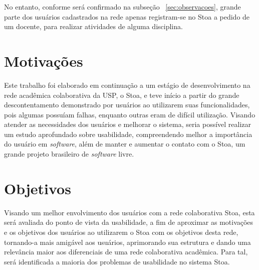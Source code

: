     No entanto, conforme será confirmado na subseção ~\ref{sec:observacoes}, grande parte dos usuários cadastrados na rede apenas registram-se no Stoa a pedido de um docente, para realizar atividades de alguma disciplina. 
    


\section{Motivações}
\label{sec:motivos}

    Este trabalho foi elaborado em continuação a um estágio de desenvolvimento na rede acadêmica colaborativa da USP, o Stoa, e teve início a partir do grande descontentamento demonstrado por usuários ao utilizarem suas funcionalidades, pois algumas possuíam falhas, enquanto outras eram de difícil utilização. Visando atender as necessidades dos usuários e melhorar o sistema, seria possível realizar um estudo aprofundado sobre usabilidade, compreendendo melhor a importância do usuário em \emph{software}, além de manter e aumentar o contato com o Stoa, um grande projeto brasileiro de \emph{software} livre. 
    
    



\section{Objetivos}
\label{sec:objetivo}

    Visando um melhor envolvimento dos usuários com a rede colaborativa Stoa, esta será avaliada do ponto de vista da usabilidade, a fim de aproximar as motivações e os objetivos dos usuários ao utilizarem o Stoa com os objetivos desta rede, tornando-a mais amigável aos usuários, aprimorando sua estrutura e dando uma relevância maior aos diferenciais de uma rede colaborativa acadêmica. Para tal, será identificada a maioria dos problemas de usabilidade no sistema Stoa. 
    
